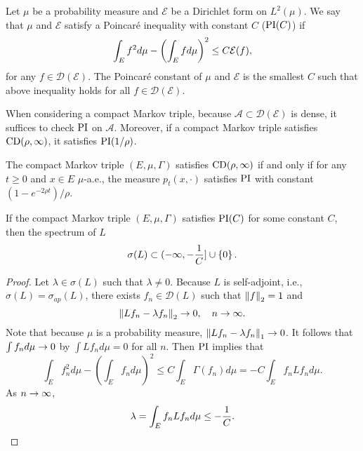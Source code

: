 \begin{defn}
    Let $\mu$ be a probability measure and $\mathcal{E}$ be a Dirichlet form on $L^2(\mu)$. We say that $\mu$ and $\mathcal{E}$ satisfy a Poincar\'e inequality with constant $C$ ($\operatorname{PI}(C)$) if
    \begin{equation*}
    	\int_E f^2 d\mu - \left(\int_E fd\mu\right)^2 \leq C\mathcal{E}(f),
    \end{equation*}
    for any $f \in \mathcal{D}(\mathcal{E})$. The Poincar\'e constant of $\mu$ and $\mathcal{E}$ is the smallest $C$ such that above inequality holds for all $f \in \mathcal{D}(\mathcal{E})$.
\end{defn}
\begin{rmk}
    When considering a compact Markov triple, because $\mathcal{A} \subset \mathcal{D}(\mathcal{E})$ is dense, it suffices to check $\operatorname{PI}$ on $\mathcal{A}$. Moreover, if a compact Markov triple satisfies $\operatorname{CD}(\rho,\infty)$, it satisfies $\operatorname{PI}(1/\rho)$.
\end{rmk}
\begin{cor}
    The compact Markov triple $(E,\mu,\Gamma)$ satisfies $\operatorname{CD}(\rho,\infty)$ if and only if for any $t \geq 0$ and $x \in E$ $\mu$-a.e., the measure $p_t(x,\cdot)$ satisfies $\operatorname{PI}$ with constant $(1 - e^{-2\rho t})/\rho$.
\end{cor}

\begin{prop}
    If the compact Markov triple $(E,\mu,\Gamma)$ satisfies $\operatorname{PI}(C)$ for some constant $C$, then the spectrum of $L$
    \begin{equation*}
    	\sigma(L) \subset (-\infty,-\frac{1}{C}] \cup \left\{0\right\}.
    \end{equation*}
\end{prop}
\begin{proof}
    Let $\lambda \in \sigma(L)$ such that $\lambda \neq 0$. Because $L$ is self-adjoint, i.e., $\sigma(L) = \sigma_{ap}(L)$, there exists $f_n \in \mathcal{D}(L)$ such that $\left\lVert f\right\lVert_2 = 1$ and
    \begin{equation*}
    	\left\lVert Lf_n - \lambda f_n\right\lVert_2 \rightarrow 0,\quad n \rightarrow \infty.
    \end{equation*}
    Note that because $\mu$ is a probability measure, $\left\lVert Lf_n - \lambda f_n\right\lVert_1 \rightarrow 0$. It follows that $\int f_n d\mu \rightarrow 0$ by $\int Lf_n d\mu = 0$ for all $n$. Then $\operatorname{PI}$ implies that
    \begin{equation*}
    	\int_E f_n^2 d \mu-\left(\int_E f_n d \mu\right)^2 \leq C \int_E \Gamma\left(f_n\right) d \mu=-C \int_E f_n L f_n d \mu.
    \end{equation*}
    As $n\rightarrow \infty$,
    \begin{equation*}
    	\lambda = \int_E f_n L f_n d \mu \leq -\frac{1}{C}. \qedhere
    \end{equation*}
\end{proof}

